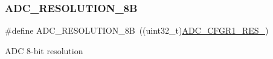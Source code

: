 \subsubsection{\texorpdfstring{A\+D\+C\+\_\+\+R\+E\+S\+O\+L\+U\+T\+I\+O\+N\+\_\+8B}{ADC\_RESOLUTION\_8B}}
{\footnotesize\ttfamily \#define A\+D\+C\+\_\+\+R\+E\+S\+O\+L\+U\+T\+I\+O\+N\+\_\+8B~((uint32\+\_\+t)\hyperlink{group___peripheral___registers___bits___definition_ga3540c4cec0b318ccc71dfa1317b4f659}{A\+D\+C\+\_\+\+C\+F\+G\+R1\+\_\+\+R\+E\+S\+\_})}

A\+DC 8-\/bit resolution 